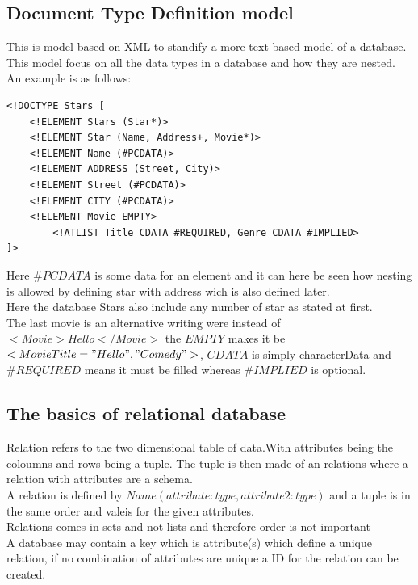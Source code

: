 \documentclass[12pt, a4paper]{article}
\begin{document}
		\subsection{Document Type Definition model}
			This is model based on XML to standify a more text based model of a database. This model focus on all the data types in a database and how they are nested.
			An example is as follows:
			\begin{lstlisting}            
<!DOCTYPE Stars [
	<!ELEMENT Stars (Star*)>
	<!ELEMENT Star (Name, Address+, Movie*)>
	<!ELEMENT Name (#PCDATA)>
	<!ELEMENT ADDRESS (Street, City)>
	<!ELEMENT Street (#PCDATA)>
	<!ELEMENT CITY (#PCDATA)>
	<!ELEMENT Movie EMPTY>
		<!ATLIST Title CDATA #REQUIRED, Genre CDATA #IMPLIED>
]>
		\end{lstlisting}
		Here $\#PCDATA$ is some data for an element and it can here be seen how nesting is allowed by defining star with address wich is also defined later.\\
		Here the database Stars also include any number of star as stated at first.\\
		The last movie is an alternative writing were instead of $<Movie>Hello</Movie>$ the $EMPTY$ makes it be $<Movie Title="Hello", "Comedy">$, $CDATA$ is simply characterData and $\#REQUIRED$ means it must be filled whereas $\#IMPLIED$ is optional.
		\subsection{The basics of relational database}
			Relation refers to the two dimensional table of data.With attributes being the coloumns and rows being a tuple. The tuple is then made of an relations where a relation with attributes are a schema. \\
			A relation is defined by $Name(attribute:type, attribute2: type)$ and a tuple is in the same order and valeis for the given attributes.\\
			Relations comes in sets and not lists and therefore order is not important\\
			A database may contain a key which is attribute(s) which define a unique relation, if no combination of attributes are unique a ID for the relation can be created.\\
\end{document}
